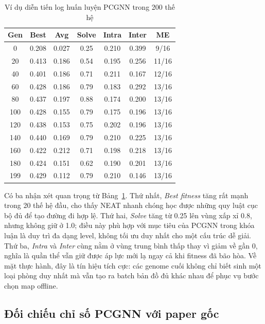 \begin{table}[H]
    \centering
    \small
    \caption{Ví dụ diễn tiến log huấn luyện PCGNN trong 200 thế hệ}
    \label{tab:pcgnn_training_progress}
    \begin{tabular}{c c c c c c c}
        \toprule
        \textbf{Gen} & \textbf{Best} & \textbf{Avg} & \textbf{Solve} & \textbf{Intra} & \textbf{Inter} & \textbf{ME} \\
        \midrule
        0 & 0.208 & 0.027 & 0.25 & 0.210 & 0.399 & 9/16 \\
        20 & 0.413 & 0.186 & 0.54 & 0.195 & 0.256 & 11/16 \\
        40 & 0.401 & 0.186 & 0.71 & 0.211 & 0.167 & 12/16 \\
        60 & 0.428 & 0.186 & 0.79 & 0.183 & 0.292 & 13/16 \\
        80 & 0.437 & 0.197 & 0.88 & 0.174 & 0.200 & 13/16 \\
        100 & 0.428 & 0.155 & 0.79 & 0.175 & 0.196 & 13/16 \\
        120 & 0.438 & 0.153 & 0.75 & 0.202 & 0.196 & 13/16 \\
        140 & 0.440 & 0.169 & 0.79 & 0.210 & 0.225 & 13/16 \\
        160 & 0.422 & 0.212 & 0.71 & 0.198 & 0.218 & 13/16 \\
        180 & 0.424 & 0.151 & 0.62 & 0.190 & 0.201 & 13/16 \\
        199 & 0.429 & 0.112 & 0.79 & 0.210 & 0.146 & 13/16 \\
        \bottomrule
    \end{tabular}
\end{table}

Có ba nhận xét quan trọng từ Bảng~\ref{tab:pcgnn_training_progress}. Thứ nhất, \textit{Best fitness} tăng rất mạnh trong 20 thế hệ đầu, cho thấy NEAT nhanh chóng học được những quy luật cục bộ đủ để tạo đường đi hợp lệ. Thứ hai, \textit{Solve} tăng từ 0.25 lên vùng xấp xỉ 0.8, nhưng không giữ ở 1.0; điều này phù hợp với mục tiêu của PCGNN trong khóa luận là duy trì đa dạng level, không tối ưu duy nhất cho một cấu trúc dễ giải. Thứ ba, \textit{Intra} và \textit{Inter} cùng nằm ở vùng trung bình thấp thay vì giảm về gần 0, nghĩa là quần thể vẫn giữ được áp lực mới lạ ngay cả khi fitness đã bão hòa. Về mặt thực hành, đây là tín hiệu tích cực: các genome cuối không chỉ biết sinh một loại phòng duy nhất mà vẫn tạo ra batch bản đồ đủ khác nhau để phục vụ bước chọn map offline.

\subsection{Đối chiếu chỉ số PCGNN với paper gốc}

